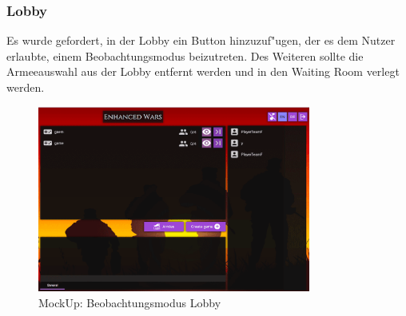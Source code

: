 \documentclass[12pt, titlepage]{scrartcl}
\begin{document}
	        \subsubsection{Lobby}
	           Es wurde gefordert, in der Lobby ein Button hinzuzuf"ugen, der es dem Nutzer erlaubte, einem Beobachtungsmodus beizutreten. Des Weiteren sollte die Armeeauswahl aus der Lobby entfernt werden und in den Waiting Room verlegt werden. \\
	            \begin{figure}[H] 
    				\centering
    				\includegraphics[width=0.8\textwidth]{images/mockUps/LobbyWatchMode.png}
    				\caption{MockUp: Beobachtungsmodus Lobby}
    				\label{Watch_Mode}
			    \end{figure}
\end{document}
